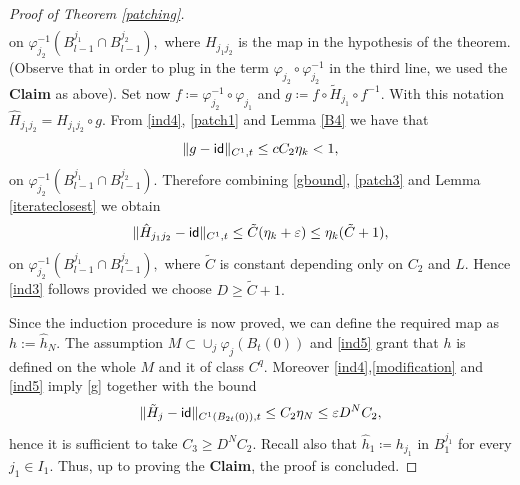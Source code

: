 \documentclass[11pt]{article}
\newcommand{\eps}{\varepsilon}
\renewcommand{\phi}{\varphi}
\theoremstyle{plain}
\theoremstyle{definition}
\numberwithin{equation}{section}
\begin{document}
\begin{proof}[Proof of Theorem \ref{patching}]
\begin{align*}
	\end{align*}
	on $\phi_{j_2}^{-1}(B_{l-1}^{j_1} \cap B_{l-1}^{j_2} ),$ where $H_{j_1j_2}$ is the map in the hypothesis of the theorem. (Observe that in order to plug in the term $\phi_{j_2} \circ \phi_{j_2}^{-1}$ in the third line, we used the \textbf{Claim} as above). Set now $f\coloneqq \phi_{j_2}^{-1} \circ \phi_{j_1}$  and $g\coloneqq f \circ \tilde H_{j_1} \circ f^{-1}$. With this notation  $\hat H_{j_1j_2}=H_{j_1j_2} \circ g$. From \eqref{ind4}, \eqref{patch1} and Lemma \ref{B4} we have that
	\begin{equation}\label{gbound}
		\|g-{\sf{id}}\|_{C^1,t}\le cC_2\eta_k<1,
	\end{equation}
on $\phi_{j_2}^{-1}(B_{l-1}^{j_1} \cap B_{l-1}^{j_2} ).$
	Therefore combining \eqref{gbound}, \eqref{patch3} and Lemma \ref{iterateclosest} we obtain 
	\[ \|\hat H_{j_1j_2}-{\sf{id}}\|_{C^1,t}\le \tilde C(\eta_k+\eps) \le \eta_k( \tilde C+1),\]
	on $\phi_{j_2}^{-1}(B_{l-1}^{j_1} \cap B_{l-1}^{j_2} ),$ where $\tilde C$ is constant depending only on $C_2$ and $L$. Hence \eqref{ind3} follows provided we choose $D\ge  \tilde C+1.$
	
	Since the induction procedure is now proved, we can define the required map as $h:=\hat h_N$. The assumption $M \subset \cup_j \phi_j(B_{t}(0))$ and \eqref{ind5} grant that $h$ is defined on the whole $M$ and it of class $C^q$. Moreover \eqref{ind4},\eqref{modification} and \eqref{ind5}  imply \eqref{g} together with the bound
	\[\|\tilde H_{j}-{\sf{id}} \|_{C^1(B_{2t}(0)),t}\le C_2\eta_{N}\le \eps D^NC_2,	\]
	hence it is sufficient to take $C_3\ge D^NC_2$. Recall also that $\hat h_1\coloneqq h_{j_1}$ in $B_1^{j_1}$ for every $j_1 \in I_1$. Thus, up to proving the {\bf Claim}, the proof  is concluded.
	

\end{proof}
\end{document}

